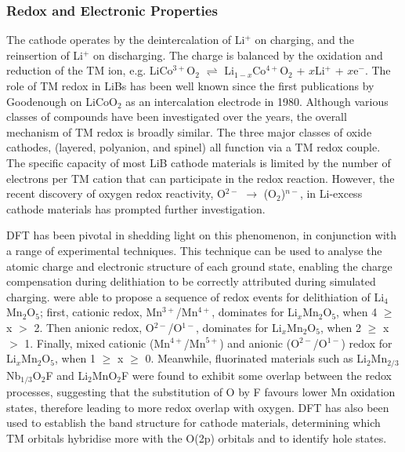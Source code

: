 \documentclass[../main.tex]{subfiles}
\begin{document}
\subsubsection{Redox and Electronic Properties}
The cathode operates by the deintercalation of Li$^+$ on charging, and the reinsertion of Li$^+$ on discharging. The charge is balanced by the oxidation and reduction of the TM ion, e.g. LiCo$^{3+}$O$_2$ $\rightleftharpoons$ Li$_{1-x}$Co$^{4+}$O$_2$ + $x$Li$^+$ + $x$e$^-$. 
The role of TM redox in LiBs has been well known since the first publications by Goodenough on LiCoO$_2$ as an intercalation electrode in 1980.\cite{mizushima1980lixcoo2} Although various classes of compounds have been investigated over the years, the overall mechanism of TM redox is broadly similar. The three major classes of oxide cathodes, (layered,\cite{mizushima1980lixcoo2} polyanion,\cite{padhi1997olivine} and spinel\cite{Thackeray1983}) all function via a TM redox couple. The specific capacity of most LiB cathode materials is limited by the number of electrons per TM cation that can participate in the redox reaction. However, the recent discovery of oxygen redox reactivity, O$^{2-}$ $\to$ (O$_2$)$^{n-}$,  in Li-excess cathode materials\cite{Koga2013, Sathiya2013, Oishi2015, Sathiya2015, McCalla2015, Cao2015, Shimoda2016, Chen2016, Luo2016a, Hy2016, Muhammad2016, Seo2016, Gent2017, Zhan2017,  Zheng2017,Assat2018, BenYahia2019, naylor2019depth, Hua2019, House2020, Li2019, Eum2020, Gent2020, Sharpe2020} has prompted further investigation.

DFT has been pivotal in shedding light on this phenomenon, in conjunction with a range of experimental techniques. This technique can be used to analyse the atomic charge and electronic structure of each ground state, enabling the charge compensation during delithiation to be correctly attributed during simulated charging. \citeauthor{Yao2018} were able to propose a sequence of redox events for delithiation of Li$_4$Mn$_2$O$_5$;\cite{Yao2018} first, cationic redox, Mn$^{3+}$/Mn$^{4+}$, dominates for Li$_x$Mn$_2$O$_5$, when 4 $\geq$ x $>$ 2. Then anionic redox, O$^{2-}$/O$^{1-}$, dominates for Li$_x$Mn$_2$O$_5$, when 2 $\geq$ x $>$ 1. Finally, mixed cationic (Mn$^{4+}$/Mn$^{5+}$) and anionic (O$^{2-}$/O$^{1-}$) redox for Li$_x$Mn$_2$O$_5$, when 1 $\geq$ x $\geq$ 0. Meanwhile, fluorinated materials such as Li$_2$Mn$_{2/3}$Nb$_{1/3}$O$_2$F\cite{Lee2018} and Li$_2$MnO$_2$F\cite{Sharpe2020} were found to exhibit some overlap between the redox processes, suggesting that the substitution of O by F favours lower Mn oxidation states, therefore leading to more redox overlap with oxygen. DFT has also been used to establish the band structure for cathode materials, determining which TM orbitals hybridise more with the O(2p) orbitals\cite{Cao2015, Sathiya2013a} and to identify hole states.\cite{Zhan2017, Xiao2012}
\end{document}
